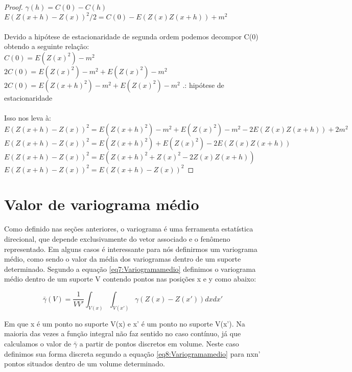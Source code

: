 \begin{proof}		
$ \gamma(h) = C(0) - C(h)$
\\$ E\left( Z(x+h)-Z(x) \right)^2/2 = C(0)-E(Z(x)Z(x+h))+m^2$\\
\\Devido a hipótese de estacionaridade de segunda ordem podemos decompor C(0) obtendo a seguinte relação:\\
$C(0) =E(Z(x)^2)-m^2$\\
$2C(0)=E(Z(x)^2)-m^2+E(Z(x)^2)-m^2$\\
$2C(0) = E(Z(x+h)^2)-m^2 + E(Z(x)^2)-m^2$ .: hipótese de estacionaridade\\
\\Isso nos leva à: \\
$ E\left( Z(x+h)-Z(x) \right)^2 = E(Z(x+h)^2)-m^2 + E(Z(x)^2)-m^2-2E(Z(x)Z(x+h))+2m^2$
\\$ E\left( Z(x+h)-Z(x) \right)^2 =E(Z(x+h)^2) + E(Z(x)^2)-2E(Z(x)Z(x+h))$
\\$ E\left( Z(x+h)-Z(x) \right)^2 =E(Z(x+h)^2 + Z(x)^2-2Z(x)Z(x+h))$
\\$ E\left( Z(x+h)-Z(x) \right)^2 =E\left( Z(x+h)-Z(x) \right)^2$
\end{proof}

\section{Valor de variograma médio}

Como definido nas seções anteriores, o variograma é uma ferramenta estatística direcional, que depende exclusivamente do vetor associado e o fenômeno representado. Em alguns casos é interessante para nós definirmos um variograma médio, como sendo o valor da média dos variogramas dentro de um suporte determinado. Segundo a equação \eqref{eq7:Variogramamedio} definimos o variograma médio dentro de um suporte V contendo pontos nas posições x e y como abaixo:

\begin{equation}\label{eq7:Variogramamedio}
\bar{\gamma } (V) =\frac{1}{VV'} \int_{V(x)} \int_{V(x')} \gamma (Z(x)-Z(x'))dx dx'
\end{equation}

Em que x é um ponto no suporte V(x) e x' é um ponto no suporte V(x'). Na maioria das vezes a função integral não faz sentido no caso contínuo, já que calculamos o valor de $ \bar{\gamma }$ a partir de pontos discretos em volume. Neste caso definimos sua forma discreta segundo a equação \eqref{eq8:Variogramamedio} para nxn' pontos situados dentro de um volume determinado.  

